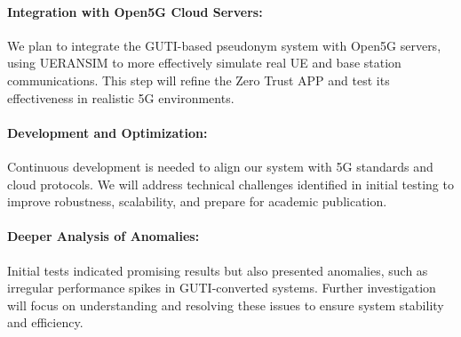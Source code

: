 \documentclass[sigplan,screen]{acmart}
\begin{document}
\paragraph{Integration with Open5G Cloud Servers:}
We plan to integrate the GUTI-based pseudonym system with Open5G servers, using UERANSIM to more effectively simulate real UE and base station communications. This step will refine the Zero Trust APP and test its effectiveness in realistic 5G environments.
\paragraph{Development and Optimization:}
Continuous development is needed to align our system with 5G standards and cloud protocols. We will address technical challenges identified in initial testing to improve robustness, scalability, and prepare for academic publication.
\paragraph{Deeper Analysis of Anomalies:}
Initial tests indicated promising results but also presented anomalies, such as irregular performance spikes in GUTI-converted systems. Further investigation will focus on understanding and resolving these issues to ensure system stability and efficiency.




\end{document}

